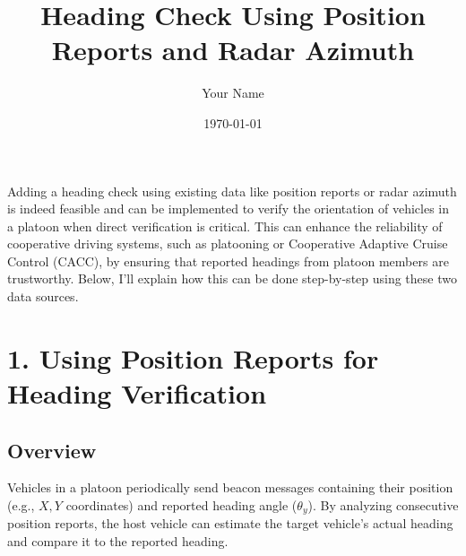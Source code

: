 \documentclass{article}
\title{Heading Check Using Position Reports and Radar Azimuth}
\author{Your Name}
\date{\today}
\begin{document}
\maketitle

Adding a heading check using existing data like position reports or radar azimuth is indeed feasible and can be implemented to verify the orientation of vehicles in a platoon when direct verification is critical. This can enhance the reliability of cooperative driving systems, such as platooning or Cooperative Adaptive Cruise Control (CACC), by ensuring that reported headings from platoon members are trustworthy. Below, I'll explain how this can be done step-by-step using these two data sources.

\section*{1. Using Position Reports for Heading Verification}

\subsection*{Overview}
Vehicles in a platoon periodically send beacon messages containing their position (e.g., \(X, Y\) coordinates) and reported heading angle (\(\theta_y\)). By analyzing consecutive position reports, the host vehicle can estimate the target vehicle's actual heading and compare it to the reported heading.
\end{document}
